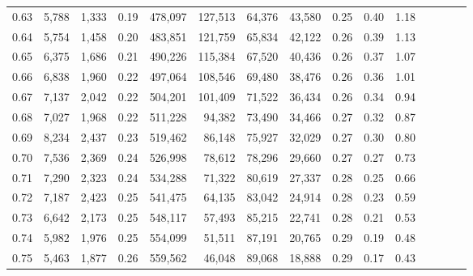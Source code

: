 \begin{tabular}{rrrcrrrrrrrrrrr}
0.63 &   5,788 &  1,333 &                                       0.19 &  478,097 &  127,513 &   64,376 &   43,580 &  0.25 &  0.40 &                         1.18 \\
0.64 &   5,754 &  1,458 &                                       0.20 &  483,851 &  121,759 &   65,834 &   42,122 &  0.26 &  0.39 &                         1.13 \\
0.65 &   6,375 &  1,686 &                                       0.21 &  490,226 &  115,384 &   67,520 &   40,436 &  0.26 &  0.37 &                         1.07 \\
0.66 &   6,838 &  1,960 &                                       0.22 &  497,064 &  108,546 &   69,480 &   38,476 &  0.26 &  0.36 &                         1.01 \\
0.67 &   7,137 &  2,042 &                                       0.22 &  504,201 &  101,409 &   71,522 &   36,434 &  0.26 &  0.34 &                         0.94 \\
0.68 &   7,027 &  1,968 &                                       0.22 &  511,228 &   94,382 &   73,490 &   34,466 &  0.27 &  0.32 &                         0.87 \\
0.69 &   8,234 &  2,437 &                                       0.23 &  519,462 &   86,148 &   75,927 &   32,029 &  0.27 &  0.30 &                         0.80 \\
0.70 &   7,536 &  2,369 &                                       0.24 &  526,998 &   78,612 &   78,296 &   29,660 &  0.27 &  0.27 &                         0.73 \\
0.71 &   7,290 &  2,323 &                                       0.24 &  534,288 &   71,322 &   80,619 &   27,337 &  0.28 &  0.25 &                         0.66 \\
0.72 &   7,187 &  2,423 &                                       0.25 &  541,475 &   64,135 &   83,042 &   24,914 &  0.28 &  0.23 &                         0.59 \\
0.73 &   6,642 &  2,173 &                                       0.25 &  548,117 &   57,493 &   85,215 &   22,741 &  0.28 &  0.21 &                         0.53 \\
0.74 &   5,982 &  1,976 &                                       0.25 &  554,099 &   51,511 &   87,191 &   20,765 &  0.29 &  0.19 &                         0.48 \\
0.75 &   5,463 &  1,877 &                                       0.26 &  559,562 &   46,048 &   89,068 &   18,888 &  0.29 &  0.17 &                         0.43 \\

\end{tabular}
